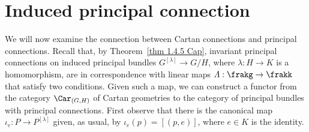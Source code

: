 \section{Induced principal connection}



We will now examine the connection between Cartan connections and principal connections. Recall that, by Theorem~\ref{thm 1.4.5 Cap}, invariant principal connections on induced principal bundles $G^{[\lambda]}\to G\slash H$, where $\lambda:H\to K$ is a homomorphism, are in correspondence with linear maps $\varLambda:\frakg\to\frakk$ that satisfy two conditions. Given such a map, we can construct a functor from the category $\Car_{(G,H)}$ of Cartan geometries to the category of principal bundles with principal connections. First observe that there is the canonical map $\iota_e:P\to P^{[\lambda]}$ given, as usual, by $\iota_e(p)=[(p,e)]$, where $e\in K$ is the identity. 


